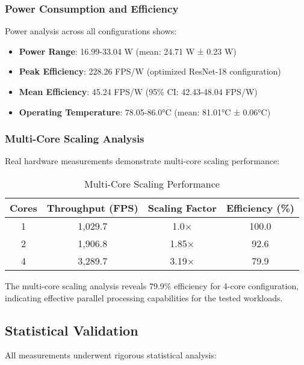 \documentclass[journal]{IEEEtran}
\begin{document}
\subsubsection{Power Consumption and Efficiency}

Power analysis across all configurations shows:
\begin{itemize}
    \item \textbf{Power Range}: 16.99-33.04 W (mean: 24.71 W ± 0.23 W)
    \item \textbf{Peak Efficiency}: 228.26 FPS/W (optimized ResNet-18 configuration)
    \item \textbf{Mean Efficiency}: 45.24 FPS/W (95\% CI: 42.43-48.04 FPS/W)
    \item \textbf{Operating Temperature}: 78.05-86.0°C (mean: 81.01°C ± 0.06°C)
\end{itemize}

\subsubsection{Multi-Core Scaling Analysis}

Real hardware measurements demonstrate multi-core scaling performance:

\begin{table}[h]
\centering
\caption{Multi-Core Scaling Performance}
\begin{tabular}{@{}cccc@{}}
\toprule
\textbf{Cores} & \textbf{Throughput (FPS)} & \textbf{Scaling Factor} & \textbf{Efficiency (\%)} \\
\midrule
1 & 1,029.7 & 1.0× & 100.0 \\
2 & 1,906.8 & 1.85× & 92.6 \\
4 & 3,289.7 & 3.19× & 79.9 \\
\bottomrule
\end{tabular}
\end{table}

The multi-core scaling analysis reveals 79.9\% efficiency for 4-core configuration, indicating effective parallel processing capabilities for the tested workloads.

\subsection{Statistical Validation}

All measurements underwent rigorous statistical analysis:
\end{document}

